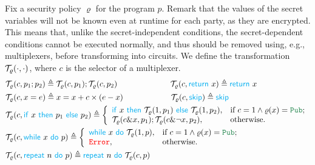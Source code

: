 \smallskip
{}
Fix a security policy $\varrho$ for the program $p$. Remark that the values of the secret variables will not be known even at runtime for each party, as they are encrypted.
This means that, unlike the secret-independent conditions, the secret-dependent conditions cannot be executed normally, and thus should be removed using, e.g., multiplexers, before transforming into circuits.
We define the transformation $\mathcal{T}_\varrho(\cdot,\cdot)$, where $c$ is the selector of a multiplexer.
{\small\begin{align*}
   &  \Enc_\varrho(c,p_1; p_2)\triangleq\Enc_\varrho(c,p_1);\Enc_\varrho(c,p_2) \qquad\qquad \quad\quad~~ \Enc_\varrho(c,{\Preturn} \ x)\triangleq {\Preturn} \ x \\
   & \Enc_\varrho(c,x = e)\triangleq x= x+ c\times (e-x)  \qquad \qquad \qquad\Enc_\varrho(c,\Pskip)\triangleq \Pskip  \\
  & \Enc_\varrho(c,{\Pif} \ x \ {\Pthen} \  p_1 \ {\Pelse} \ p_2 )\triangleq
\left\{
  \begin{array}{ll}
    {\Pif} \ x \ {\Pthen} \  \Enc_\varrho(1,p_1) \ {\Pelse} \ \Enc_\varrho(1,p_2), & \hbox{if $c=1\wedge\varrho(x)=\Pub$;} \\
   \Enc_\varrho(c\& x, p_1);\Enc_\varrho(c\& \neg x, p_2), & \hbox{otherwise.}
  \end{array}
\right. \\
  & \Enc_\varrho(c,{\Pwhile} \ x \ \Pdo\ p)\triangleq
            \left\{
              \begin{array}{ll}
               {\Pwhile} \ x \ \Pdo\ \Enc_\varrho(1,p), & \hbox{if $c=1\wedge\varrho(x)=\Pub$;} \\
               \textcolor{red}{\tt Error}, & \hbox{otherwise.}
              \end{array}
            \right. \\
&   \Enc_\varrho(c,{\Prepeat} \ n \ \Pdo\ p)\triangleq {\Prepeat} \ n \ \Pdo\ \Enc_\varrho(c,p)
\end{align*}}
